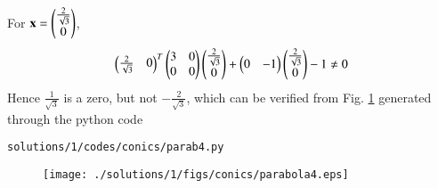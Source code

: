 \begin{enumerate}
\begin{align}
\end{align}
For $\mathbf{x} = \begin{pmatrix}\frac{2}{\sqrt{3}}\\0\end{pmatrix}$,
\begin{align}
\begin{pmatrix}\frac{2}{\sqrt{3}} & 0\end{pmatrix}^T \begin{pmatrix}3 & 0\\0 & 0\end{pmatrix}\begin{pmatrix}\frac{2}{\sqrt{3}}\\0\end{pmatrix}+\begin{pmatrix}0 & -1\end{pmatrix}\begin{pmatrix}\frac{2}{\sqrt{3}}\\0\end{pmatrix}-1\ne 0
\end{align}
Hence $\frac{1}{\sqrt{3}}$ is a zero, but not $-\frac{2}{\sqrt{3}} $, which can be verified from Fig.  \ref{fig:5.2.1_parab4} generated through 
the python code 
\begin{lstlisting}
solutions/1/codes/conics/parab4.py
\end{lstlisting}
\begin{figure}[!ht]
\texttt{[image: ./solutions/1/figs/conics/parabola4.eps]}
\caption{}
\label{fig:5.2.1_parab4}
\end{figure}


\end{enumerate}
